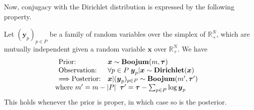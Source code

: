 Now, conjugacy with the Dirichlet distribution is expressed by the following property.
\begin{proposition}
Let $(\boldsymbol{y}_p)_{p\in P}$ be a family of random variables over the simplex of $\mathbb{R}_+^N$, which are mutually independent given a random variable $\boldsymbol{x}$ over $\mathbb{R}_+^N$. We have
\[
\begin{array}{l}
\begin{array}{ll}
\textrm{Prior:} & \boldsymbol{x} \sim \mathbf{Boojum}(m,\boldsymbol{\tau})\\
\textrm{Observation:} & \forall p\in P\;\boldsymbol{y}_p|\boldsymbol{x} \sim \mathbf{Dirichlet}(\boldsymbol{x})\\
\Longrightarrow
\textrm{Posterior:} &
\boldsymbol{x}|(\boldsymbol{y}_p)_{p\in P} \sim \mathbf{Boojum}(m',\boldsymbol{\tau}')
\end{array}\\
\textrm{where } m'=m-|P|\;\;\boldsymbol{\tau}'=\boldsymbol{\tau}-\sum_{p\in P}\log\boldsymbol{y}_p
\end{array}
\]
This holds whenever the prior is proper, in which case so is the posterior.
\end{proposition}
